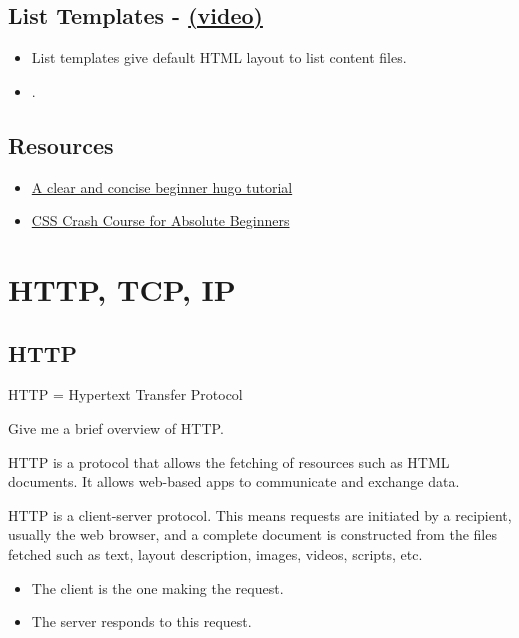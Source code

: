 \subsection{List Templates - \href{https://youtu.be/8b2YTSMdMps}{(video)}}
\begin{itemize}
	\item List templates give default HTML layout to list content files.
	\item .
\end{itemize}

\subsection*{Resources}
\begin{itemize}
	\item \href{https://www.linkedin.com/learning/learning-static-site-building-with-hugo-2/build-a-static-site-with-hugo?resume=false}{A clear and concise beginner hugo tutorial}
	\item \href{https://youtu.be/yfoY53QXEnI}{CSS Crash Course for Absolute Beginners}
\end{itemize}


\section{HTTP, TCP, IP}

\subsection{HTTP}

\begin{quest}
	\item \cloze HTTP = Hypertext Transfer Protocol
	\item Give me a brief overview of HTTP.
	\begin{ans}
		HTTP is a protocol that allows the fetching of resources such as HTML documents. It allows web-based apps to communicate and exchange data. 

		HTTP is a client-server protocol. This means requests are initiated by a recipient, usually the web browser, and a complete document is constructed from the files fetched such as text, layout description, images, videos, scripts, etc.
		\begin{itemize}
			\item The client is the one making the request.
			\item The server responds to this request. 
		\end{itemize}
	\end{ans}
\end{quest}

